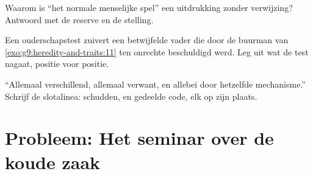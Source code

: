 \begin{exercise}[$\star\star$]\label{exo:g9:unique-individuals:10}
Waarom is ``het normale menselijke spel'' een uitdrukking zonder
verwijzing? Antwoord met de reserve en de stelling.
\end{exercise}

\begin{exercise}[$\star\star$]\label{exo:g9:unique-individuals:11}
Een ouderschapstest zuivert een betwijfelde vader die door de
buurman van \cref{exo:g9:heredity-and-traits:11} ten onrechte
beschuldigd werd. Leg uit wat de test nagaat, positie voor positie.
\end{exercise}

\begin{exercise}[$\star\star\star$]\label{exo:g9:unique-individuals:12}
``Allemaal verschillend, allemaal verwant, en allebei door
hetzelfde mechanisme.'' Schrijf de slotalinea: schudden, 
en gedeelde code, elk op zijn plaats.
\end{exercise}

\section{Probleem: Het seminar over de koude zaak}

